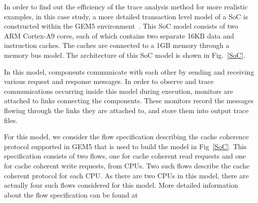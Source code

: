 \documentclass[conference]{IEEEtran}
\begin{document}
In order to find out the efficiency of the trace analysis method for more realistic examples, in this case study, a more detailed transaction level model of a SoC is constructed within the GEM5 environment~\cite{Binkert2011}.  This SoC model consists of two ARM Cortex-A9 cores, each of which contains two separate 16KB data and instruction caches.  The caches are connected to a 1GB memory through a memory bus model.  The architecture of this SoC model is shown in Fig.~\ref{SoC}.  

In this model, components communicate with each other by sending and receiving various request and response messages.  In order to observe and trace communications occurring inside this model during execution, monitors are attached to links connecting the components. These monitors record the messages flowing through the links they are attached to, and store them into output trace files.




For this model, we consider the flow specification describing the cache coherence protocol supported in GEM5 that is used to build the model in Fig~\ref{SoC}.  This specification consists of two flows, one for cache coherent read requests and one for  cache coherent write requests, from CPUs.  Two such flows describe the cache coherent protocol for each CPU.  As there are two CPUs in this model, there are actually four such flows considered for this model.  More detailed information about the flow specification can be found at 
\end{document}
